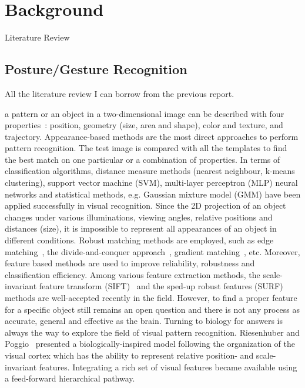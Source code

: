 \chapter{Background}
\label{cha:bkg}
Literature Review

\section{Posture/Gesture Recognition}
\label{sec:pgr}
All the literature review I can borrow from the previous report.

a pattern or an object in a two-dimensional image can be described with four properties~\cite{wysoski2008fast}: position, geometry (size, area and shape), color and texture, and trajectory. Appearance-based methods are the most direct approaches to perform pattern recognition. 
The test image is compared with all the templates to find the best match on one particular or a combination of properties. 
In terms of classification algorithms, distance measure methods (nearest neighbour, k-means clustering), support vector machine (SVM), multi-layer perceptron (MLP) neural networks and statistical methods, e.g. Gaussian mixture model (GMM) have been applied successfully in visual recognition. 
Since the 2D projection of an object changes under various illuminations, viewing angles, relative positions and distances (size), it is impossible to represent all appearances of an object in different conditions. 
Robust matching methods are employed, such as edge matching~\cite{canny1986computational}, the divide-and-conquer approach~\cite{toygar2004multiple}, gradient matching~\cite{wei2006robust}, etc. 
Moreover, feature based methods are used to improve reliability, robustness and classification efficiency. 
Among various feature extraction methods, the scale-invariant feature transform (SIFT)~\cite{lowe2004distinctive} and the sped-up robust features (SURF)~\cite{bay2008speeded} methods are well-accepted recently in the field. 
However, to find a proper feature for a specific object still remains an open question and there is not any process as accurate, general and effective as the brain.
Turning to biology for answers is always the way to explore the field of visual pattern recognition. 
Riesenhuber and Poggio~\cite{riesenhuber1999hierarchical} presented a biologically-inspired model following the organization of the visual cortex which has the ability to represent relative position- and scale-invariant features. Integrating a rich set of visual features became available using a feed-forward hierarchical pathway. 

